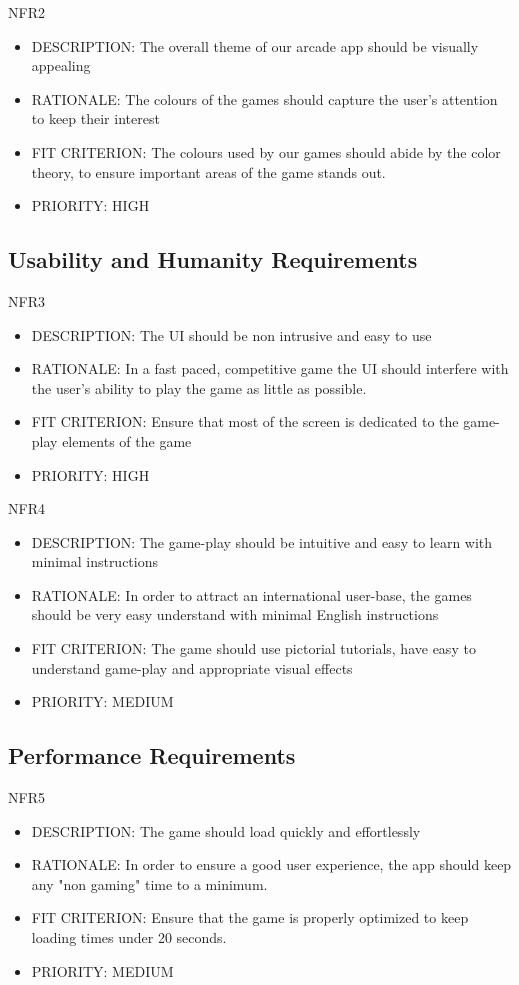 \documentclass[12pt, titlepage]{article}
\begin{document}
NFR2 
\begin{itemize}
    \item DESCRIPTION: The overall theme of our arcade app should be visually appealing
    \item RATIONALE: The colours of the games should capture the user's attention to keep their interest 
    \item FIT CRITERION: The colours used by our games should abide by the color theory, to ensure important areas of the game stands out.
    \item PRIORITY: HIGH
\end{itemize}


\subsection{Usability and Humanity Requirements}
NFR3
\begin{itemize}
    \item DESCRIPTION: The UI should be non intrusive and easy to use
    \item RATIONALE: In a fast paced, competitive game the UI should interfere with the user's 
ability to play the game as little as possible.
    \item FIT CRITERION: Ensure that most of the screen is dedicated to the game-play elements
of the game
    \item PRIORITY: HIGH
\end{itemize}

NFR4
\begin{itemize}
    \item DESCRIPTION: The game-play should be intuitive and easy to learn with minimal instructions
    \item RATIONALE: In order to attract an international user-base, the games should be very
easy understand with minimal English instructions
    \item FIT CRITERION: The game should use pictorial tutorials, have easy to understand game-play
and appropriate visual effects
    \item PRIORITY: MEDIUM
\end{itemize}

\subsection{Performance Requirements}
NFR5
\begin{itemize}
    \item DESCRIPTION: The game should load quickly and effortlessly
    \item RATIONALE: In order to ensure a good user experience, the app should keep any
"non gaming" time to a minimum.
    \item FIT CRITERION: Ensure that the game is properly optimized to keep loading times under
20 seconds.
    \item PRIORITY: MEDIUM
\end{itemize}
\end{document}

